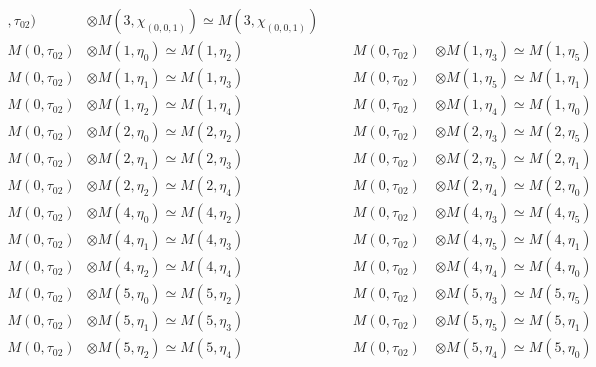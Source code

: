 \begin{align*}
,\tau_{02}) &\otimes M(3,\chi_{(0,0,1)}) \simeq M(3,\chi_{(0,0,1)})\\
M(0,\tau_{02}) &\otimes M(1,\eta_{0}) \simeq M(1,\eta_{2}) &&& M(0,\tau_{02}) \
&\otimes M(1,\eta_{3}) \simeq M(1,\eta_{5})\\
M(0,\tau_{02}) &\otimes M(1,\eta_{1}) \simeq M(1,\eta_{3}) &&& M(0,\tau_{02}) \
&\otimes M(1,\eta_{5}) \simeq M(1,\eta_{1})\\
M(0,\tau_{02}) &\otimes M(1,\eta_{2}) \simeq M(1,\eta_{4}) &&& M(0,\tau_{02}) \
&\otimes M(1,\eta_{4}) \simeq M(1,\eta_{0})\\
M(0,\tau_{02}) &\otimes M(2,\eta_{0}) \simeq M(2,\eta_{2}) &&& M(0,\tau_{02}) \
&\otimes M(2,\eta_{3}) \simeq M(2,\eta_{5})\\
M(0,\tau_{02}) &\otimes M(2,\eta_{1}) \simeq M(2,\eta_{3}) &&& M(0,\tau_{02}) \
&\otimes M(2,\eta_{5}) \simeq M(2,\eta_{1})\\
M(0,\tau_{02}) &\otimes M(2,\eta_{2}) \simeq M(2,\eta_{4}) &&& M(0,\tau_{02}) \
&\otimes M(2,\eta_{4}) \simeq M(2,\eta_{0})\\
M(0,\tau_{02}) &\otimes M(4,\eta_{0}) \simeq M(4,\eta_{2}) &&& M(0,\tau_{02}) \
&\otimes M(4,\eta_{3}) \simeq M(4,\eta_{5})\\
M(0,\tau_{02}) &\otimes M(4,\eta_{1}) \simeq M(4,\eta_{3}) &&& M(0,\tau_{02}) \
&\otimes M(4,\eta_{5}) \simeq M(4,\eta_{1})\\
M(0,\tau_{02}) &\otimes M(4,\eta_{2}) \simeq M(4,\eta_{4}) &&& M(0,\tau_{02}) \
&\otimes M(4,\eta_{4}) \simeq M(4,\eta_{0})\\
M(0,\tau_{02}) &\otimes M(5,\eta_{0}) \simeq M(5,\eta_{2}) &&& M(0,\tau_{02}) \
&\otimes M(5,\eta_{3}) \simeq M(5,\eta_{5})\\
M(0,\tau_{02}) &\otimes M(5,\eta_{1}) \simeq M(5,\eta_{3}) &&& M(0,\tau_{02}) \
&\otimes M(5,\eta_{5}) \simeq M(5,\eta_{1})\\
M(0,\tau_{02}) &\otimes M(5,\eta_{2}) \simeq M(5,\eta_{4}) &&& M(0,\tau_{02}) \
&\otimes M(5,\eta_{4}) \simeq M(5,\eta_{0})\\
\end{align*}

